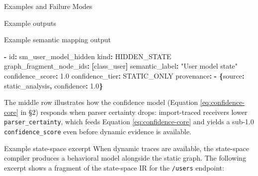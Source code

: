 \documentclass[
  ignorenonframetext,
]{beamer}
\newenvironment{Shaded}{}{}
\newcommand{\AttributeTok}[1]{\textcolor[rgb]{0.49,0.56,0.16}{#1}}
\newcommand{\FloatTok}[1]{\textcolor[rgb]{0.25,0.63,0.44}{#1}}
\newcommand{\FunctionTok}[1]{\textcolor[rgb]{0.02,0.16,0.49}{#1}}
\newcommand{\KeywordTok}[1]{\textcolor[rgb]{0.00,0.44,0.13}{\textbf{#1}}}
\newcommand{\StringTok}[1]{\textcolor[rgb]{0.25,0.44,0.63}{#1}}
\begin{document}
\begin{frame}[fragile]{Examples and Failure Modes}
\begin{block}{Example outputs}
\begin{block}{Example semantic mapping output}
\begin{Shaded}
\begin{Highlighting}[]
\KeywordTok{{-}}\AttributeTok{ }\FunctionTok{id}\KeywordTok{:}\AttributeTok{ sm\_user\_model\_hidden}
\AttributeTok{  }\FunctionTok{kind}\KeywordTok{:}\AttributeTok{ HIDDEN\_STATE}
\AttributeTok{  }\FunctionTok{graph\_fragment\_node\_ids}\KeywordTok{:}\AttributeTok{ }\KeywordTok{[}\AttributeTok{class\_user}\KeywordTok{]}
\AttributeTok{  }\FunctionTok{semantic\_label}\KeywordTok{:}\AttributeTok{ }\StringTok{"User model state"}
\AttributeTok{  }\FunctionTok{confidence\_score}\KeywordTok{:}\AttributeTok{ }\FloatTok{1.0}
\AttributeTok{  }\FunctionTok{confidence\_tier}\KeywordTok{:}\AttributeTok{ STATIC\_ONLY}
\AttributeTok{  }\FunctionTok{provenance}\KeywordTok{:}
\AttributeTok{    }\KeywordTok{{-}}\AttributeTok{ }\KeywordTok{\{}\FunctionTok{source}\KeywordTok{:}\AttributeTok{ static\_analysis}\KeywordTok{,}\AttributeTok{ }\FunctionTok{confidence}\KeywordTok{:}\AttributeTok{ }\FloatTok{1.0}\KeywordTok{\}}
\end{Highlighting}
\end{Shaded}

The middle row illustrates how the confidence model (Equation
\ref{eq:confidence-core} in §2) responds when parser certainty drops:
import-traced receivers lower \texttt{parser\_certainty}, which feeds
Equation \ref{eq:confidence-core} and yields a sub-1.0
\texttt{confidence\_score} even before dynamic evidence is available.
\end{block}

\begin{block}{Example state-space excerpt}
\protect{}\label{example-state-space-excerpt}
When dynamic traces are available, the state-space compiler produces a
behavioral model alongside the static graph. The following excerpt shows
a fragment of the state-space IR for the \texttt{/users} endpoint:


\end{block}
\end{block}
\end{frame}
\end{document}
